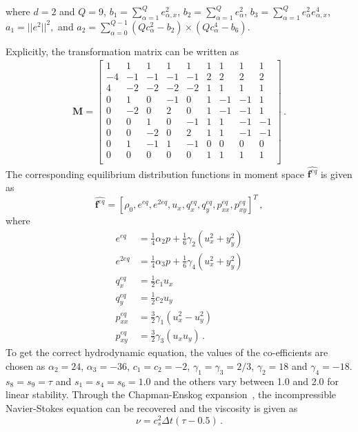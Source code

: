\noindent where $d = 2$ and $Q = 9$, $b_1=\sum_{\alpha=1}^{Q}e_{\alpha,x}^2$, 
$b_2=\sum_{\alpha=1}^{Q}e_{\alpha}^2$, 
$b_3=\sum_{\alpha=1}^{Q}e_{\alpha}^2e_{\alpha,x}^4$, $a_1=||e^2||^2,$ and 
$a_2=\sum_{\alpha=0}^{Q-1}(Qc_{\alpha}^2-b_2)\times(Qc_{\alpha}^4-b_6)$. 

Explicitly, the transformation matrix can be written as
%
\begin{align}
\mathbf{M}= \begin{bmatrix}
1 &  1 &  1 &  1 &  1 &  1 &  1 &  1 &  1 \\
-4 & -1 & -1 & -1 & -1 &  2 &  2 &  2 &  2 \\ 
4 & -2 & -2 & -2 & -2 &  1 &  1 &  1 &  1 \\
0 &  1 &  0 & -1 &  0 &  1 & -1 & -1 &  1 \\
0 & -2 &  0 &  2 &  0 &  1 & -1 & -1 &  1 \\
0 &  0 &  1 &  0 & -1 &  1 &  1 & -1 & -1 \\
0 &  0 & -2 &  0 &  2 &  1 &  1 & -1 & -1 \\
0 &  1 & -1 &  1 & -1 &  0 &  0 &  0 &  0 \\
0 &  0 &  0 &  0 &  0 &  1 &  1 &  1 &  1 \\
\end{bmatrix}\,.
\end{align}
%
The corresponding equilibrium distribution functions in moment space 
$\widehat{\mathbf{f}^{eq}}$ is given as
%
\begin{equation}
\widehat{\mathbf{f}^{eq}}=\left[\rho_0,e^{eq}, 
e^{2eq},u_x,q_x^{eq},q_y^{eq},p_{xx}^{eq},p_{xy}^{eq}\right]^T\,,
\end{equation}
%
\noindent where
%
\begin{subequations}
\begin{align}
e^{eq} & = \frac{1}{4}\alpha_2p+\frac{1}{6}\gamma_2(u_x^2+y_y^2)\\
e^{2eq} & = \frac{1}{4}\alpha_3p+\frac{1}{6}\gamma_4(u_x^2+y_y^2)\\
q_x^{eq} & = \frac{1}{2}c_1u_x\\
q_y^{eq} & = \frac{1}{2}c_2u_y \\
p_{xx}^{eq} & = \frac{3}{2}\gamma_1(u_x^2 - u_y^2)\\
p_{xy}^{eq} & = \frac{3}{2}\gamma_3(u_xu_y) \,.
\end{align}
\end{subequations}
%
To get the correct hydrodynamic equation, the values of the co-efficients are 
chosen as $\alpha_2=24$,  $\alpha_3=-36$, $c_1=c_2=-2$, 
$\gamma_1=\gamma_3=2/3$, $\gamma_2=18$ and $\gamma_4=-18$. $s_8 = s_9 = \tau$ 
and $s_1=s_4=s_6=1.0$ and the others vary between 1.0 and 2.0 for linear 
stability. Through the Chapman-Enskog expansion~\citep{Du2006}, the 
incompressible Navier-Stokes equation can be recovered and the viscosity is 
given as
%
\begin{equation}
\nu=c_s^2\Delta t(\tau-0.5)\,.
\end{equation}

